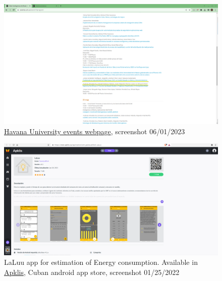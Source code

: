 \documentclass{article}
\begin{document}
\begin{figure}[h]
    \includegraphics[width=\textwidth]{images/ai_workshop.png}
    \caption{\href{https://eventos.uh.cu/event/7/program}{Havana University events webpage}, screenshot 06/01/2023}
    \label{sec:workshop}
\end{figure}

\begin{figure}[h]
    \includegraphics[width=\textwidth]{images/laluu.png}
    \caption{LaLuu app for estimation of Energy consumption. Available in \href{https://www.apklis.cu/application/com.geeksLabTech.LaLuu}{Apklis}, Cuban android app store, screenshot 01/25/2022}
    \label{sec:laluu}
\end{figure}
\end{document}
